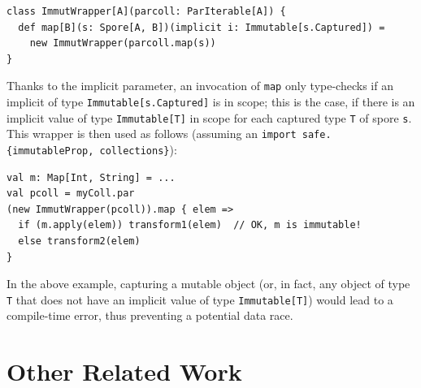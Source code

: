 \documentclass{llncs}
\begin{document}
\begin{lstlisting}
class ImmutWrapper[A](parcoll: ParIterable[A]) {
  def map[B](s: Spore[A, B])(implicit i: Immutable[s.Captured]) =
    new ImmutWrapper(parcoll.map(s))
}
\end{lstlisting}
\noindent
Thanks to the implicit parameter, an invocation of \verb|map| only type-checks if an implicit of type \verb|Immutable[s.Captured]| is in scope; this is the case, if there is an implicit value of type \verb|Immutable[T]| in scope for each captured type \verb|T| of spore \verb|s|. This wrapper is then used as follows (assuming an \verb|import safe.{immutableProp, collections}|):

\begin{lstlisting}
val m: Map[Int, String] = ...
val pcoll = myColl.par
(new ImmutWrapper(pcoll)).map { elem =>
  if (m.apply(elem)) transform1(elem)  // OK, m is immutable!
  else transform2(elem)
}
\end{lstlisting}
\noindent
In the above example, capturing a mutable object (or, in fact, any object of type \verb|T| that does not have an implicit value of type \verb|Immutable[T]|) would lead to a compile-time error, thus preventing a potential data race.





\section{Other Related Work}
\label{sec:related-work}
\end{document}
